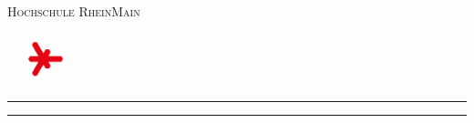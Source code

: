 \begin{titlepage}
	\iftoggle{deutsch}{%
	\newcommand{\nameA}{\thefirstnameA\space\thelastnameA}
	\newcommand{\nameB}{}
	\newcommand{\nameC}{}
	}{%
	\newcommand{\nameA}{\thelastnameA\,\space\thefirstnameA}
	\newcommand{\nameB}{}
	\newcommand{\nameC}{}
	}
	\newcommand{\HRule}{\rule{\linewidth}{0.5mm}} 	
	\centering
	\textsc{\Large Hochschule RheinMain} \par
	\begin{center}
		\includegraphics[width=0.15\textwidth]{logo-hsrm.jpg}
	\end{center}%
	\textsc{\LARGE \titelLV}\vspace{0.5cm}
		\HRule\vspace{0.4cm}
	{\huge\bfseries \untertitela}\par\vspace{0.4cm} %
	{\huge\bfseries \untertitelb}\par\vspace{0.4cm} %
		\HRule\vspace{1.5cm}
	\begin{minipage}{0.4\textwidth}
		\large
		\iftoggle{deutsch}{%
			\textit{\underline{Autor}}\par\vspace{0.5cm}
		}{%
			\textit{\underline{Author}}\par\vspace{0.5cm}
		}
		\textsc{\nameA}\par\vspace{0.5cm}
		\textsc{\nameB}\par\vspace{0.5cm}
		\textsc{\nameC}\par\vspace{0.5cm}
\end{minipage}
\vfill\vfill\vfill

\end{titlepage}
